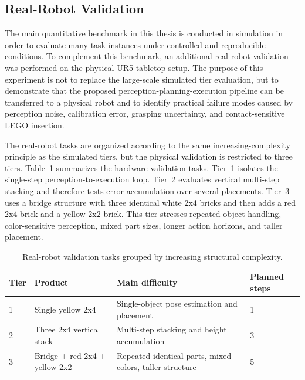 
\subsection{Real-Robot Validation}
\label{subsec:real_robot_validation}

The main quantitative benchmark in this thesis is conducted in simulation in order to evaluate
many task instances under controlled and reproducible conditions. To complement this
benchmark, an additional real-robot validation was performed on the physical UR5 tabletop
setup. The purpose of this experiment is not to replace the large-scale simulated tier
evaluation, but to demonstrate that the proposed perception-planning-execution pipeline can
be transferred to a physical robot and to identify practical failure modes caused by perception
noise, calibration error, grasping uncertainty, and contact-sensitive LEGO insertion.

The real-robot tasks are organized according to the same increasing-complexity principle as
the simulated tiers, but the physical validation is restricted to three tiers. Table~\ref{tab:real_robot_tiers}
summarizes the hardware validation tasks. Tier~1 isolates the single-step perception-to-execution
loop. Tier~2 evaluates vertical multi-step stacking and therefore tests error accumulation over
several placements. Tier~3 uses a bridge structure with three identical white 2x4 bricks and then
adds a red 2x4 brick and a yellow 2x2 brick. This tier stresses repeated-object handling,
color-sensitive perception, mixed part sizes, longer action horizons, and taller placement.

\begin{table}[t]
    \centering
    \caption{Real-robot validation tasks grouped by increasing structural complexity.}
    \label{tab:real_robot_tiers}
    \begin{tabular}{llll}
        \toprule
        Tier & Product & Main difficulty & Planned steps \\
        \midrule
        1 & Single yellow 2x4 & Single-object pose estimation and placement & 1 \\
        2 & Three 2x4 vertical stack & Multi-step stacking and height accumulation & 3 \\
        3 & Bridge + red 2x4 + yellow 2x2 & Repeated identical parts, mixed colors, taller structure & 5 \\
        \bottomrule
    \end{tabular}
\end{table}

